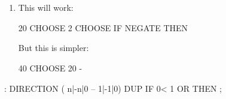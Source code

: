 \section{}
\ifeightyfour\begin{enumerate}
\item This will work:
\begin{Code}
20 CHOOSE  2 CHOOSE  IF NEGATE THEN
\end{Code}
But this is simpler:
\begin{Code}
40 CHOOSE  20 -
\end{Code}
\end{enumerate}\else
\begin{Code}
: DIRECTION  ( n|-n|0 -- 1|-1|0)  DUP  IF  0< 1 OR  THEN ;
\end{Code}
\fi

